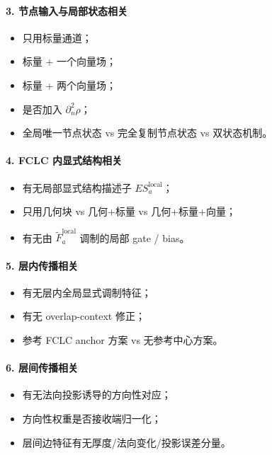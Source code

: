 \documentclass[12pt,a4paper]{ctexart}
\begin{document}
\paragraph{3. 节点输入与局部状态相关}
\begin{itemize}[leftmargin=2em]
    \item 只用标量通道；
    \item 标量 + 一个向量场；
    \item 标量 + 两个向量场；
    \item 是否加入 \(\partial_n^2\rho\)；
    \item 全局唯一节点状态 vs 完全复制节点状态 vs 双状态机制。
\end{itemize}

\paragraph{4. FCLC 内显式结构相关}
\begin{itemize}[leftmargin=2em]
    \item 有无局部显式结构描述子 \(ES_a^{\mathrm{local}}\)；
    \item 只用几何块 vs 几何+标量 vs 几何+标量+向量；
    \item 有无由 \(\tilde F_a^{\mathrm{local}}\) 调制的局部 gate / bias。
\end{itemize}

\paragraph{5. 层内传播相关}
\begin{itemize}[leftmargin=2em]
    \item 有无层内全局显式调制特征；
    \item 有无 overlap-context 修正；
    \item 参考 FCLC anchor 方案 vs 无参考中心方案。
\end{itemize}

\paragraph{6. 层间传播相关}
\begin{itemize}[leftmargin=2em]
    \item 有无法向投影诱导的方向性对应；
    \item 方向性权重是否接收端归一化；
    \item 层间边特征有无厚度/法向变化/投影误差分量。
\end{itemize}
\end{document}
